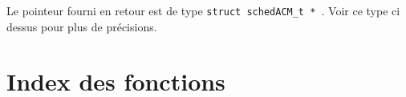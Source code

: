 \documentclass{article}
\begin{document}
   Le pointeur fourni en retour est de type {\tt struct schedACM\_t *
   }. Voir ce type ci dessus pour plus de précisions.

%
\section{Index des fonctions}

\printindex
\end{document}
